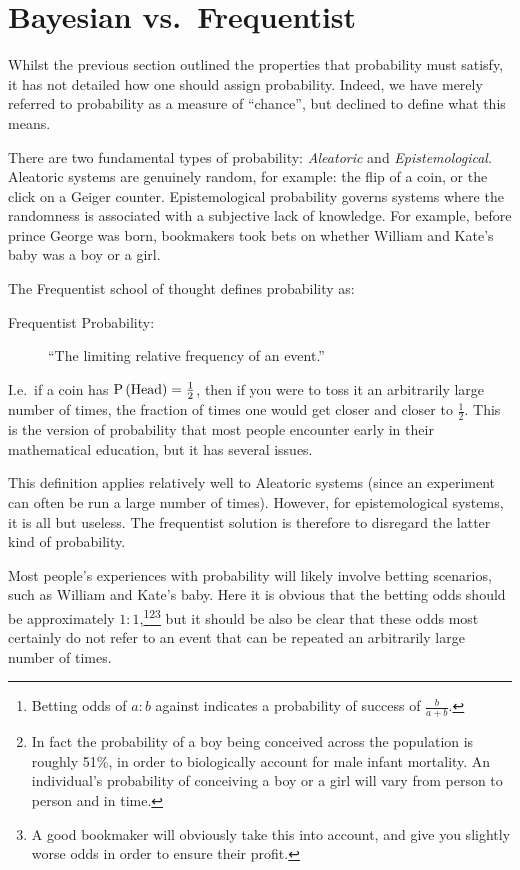 \section{Bayesian vs.\ Frequentist}
\label{sec:bay:bayesian_frequentist}

Whilst the previous section outlined the properties that probability must satisfy, it has not detailed how one should assign probability. Indeed, we have merely referred to probability as a measure of ``chance'', but declined to define what this means.

There are two fundamental types of probability: {\em Aleatoric\/} and {\em Epistemological}. Aleatoric systems are genuinely random, for example: the flip of a coin, or the click on a Geiger counter. Epistemological probability governs systems where the randomness is associated with a subjective lack of knowledge. For example, before prince George was born, bookmakers took bets on whether William and Kate's baby was a boy or a girl. 

The Frequentist school of thought defines probability as:
\begin{description}
  \item[Frequentist Probability:]``The limiting relative frequency of an event.''
\end{description}
I.e.\ if a coin has $\mathrm{P}\left(\mathrm{Head}\right)=\frac{1}{2}$, then if you were to toss it an arbitrarily large number of times, the fraction of times one would get closer and closer to $\frac{1}{2}$. This is the version of probability that most people encounter early in their mathematical education, but it has several issues.

This definition applies relatively well to Aleatoric systems (since an experiment can often be run a large number of times). However, for epistemological systems, it is all but useless. The frequentist solution is therefore to disregard the latter kind of probability.

Most people's experiences with probability will likely involve betting scenarios, such as William and Kate's baby. Here it is obvious that the betting odds should be approximately $1:1$,\footnote{Betting odds of $a:b$ against indicates a probability of success of $\frac{b}{a+b}$.}\footnote{In fact the probability of a boy being conceived across the population is roughly 51\%, in order to biologically account for male infant mortality. An individual's probability of conceiving a boy or a girl will vary from person to person and in time.}\footnote{A good bookmaker will obviously take this into account, and give you slightly worse odds in order to ensure their profit.} but it should be also be clear that these odds most certainly do not refer to an event that can be repeated an arbitrarily large number of times.

